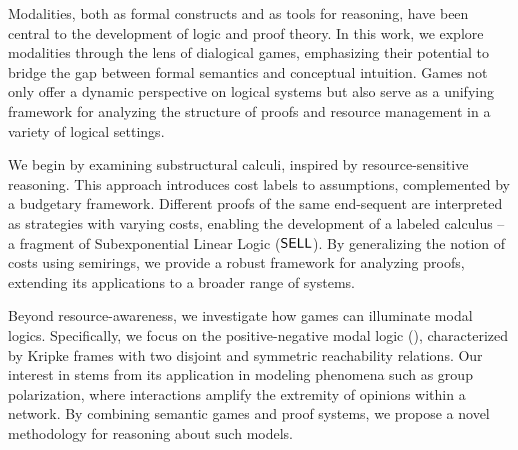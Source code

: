 


Modalities, both as formal constructs and as tools for reasoning, have been central to the development of logic and proof theory. In this work, we explore modalities through the lens of dialogical games, emphasizing their potential to bridge the gap between formal semantics and conceptual intuition. Games not only offer a dynamic perspective on logical systems but also serve as a unifying framework for analyzing the structure of proofs and resource management in a variety of logical settings.

We begin by examining substructural calculi, inspired by resource-sensitive reasoning. This approach introduces cost labels to assumptions, complemented by a budgetary framework. Different proofs of the same end-sequent are interpreted as strategies with varying costs, enabling the development of a labeled calculus -- a fragment of Subexponential Linear Logic ($\textsf{SELL}$). By generalizing the notion of costs using semirings, we provide a robust framework for analyzing proofs, extending its applications to a broader range of systems. 

Beyond resource-awareness, we investigate how games can illuminate modal logics. Specifically, we focus on the positive-negative modal logic (\PNL), characterized by Kripke frames with two disjoint and symmetric reachability relations. Our interest in \PNL stems from its application in modeling phenomena such as group polarization, where interactions amplify the extremity of opinions within a network. By combining semantic games and proof systems, we propose a novel methodology for reasoning about such models.

